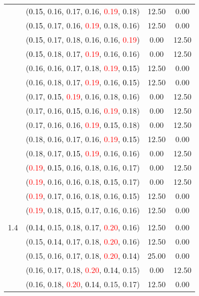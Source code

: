 \documentclass[10pt,a4paper]{report}
\begin{document}
\begin{center}
\begin{longtable}{clcc}
			&(\textcolor{black}{0.15}, 0.16, 0.17, 0.16, \textcolor{red}{0.19}, 0.18)&12.50&0.00\\
			&(\textcolor{black}{0.15}, 0.17, 0.16, \textcolor{red}{0.19}, 0.18, 0.16)&12.50&0.00\\
			&(\textcolor{black}{0.15}, 0.17, 0.18, 0.16, 0.16, \textcolor{red}{0.19})&0.00&12.50\\
			&(\textcolor{black}{0.15}, 0.18, 0.17, \textcolor{red}{0.19}, 0.16, 0.16)&0.00&12.50\\
			&(0.16, 0.16, 0.17, 0.18, \textcolor{red}{0.19}, \textcolor{black}{0.15})&12.50&0.00\\
			&(0.16, 0.18, 0.17, \textcolor{red}{0.19}, 0.16, \textcolor{black}{0.15})&12.50&0.00\\
			&(0.17, \textcolor{black}{0.15}, \textcolor{red}{0.19}, 0.16, 0.18, 0.16)&0.00&12.50\\
			&(0.17, 0.16, \textcolor{black}{0.15}, 0.16, \textcolor{red}{0.19}, 0.18)&0.00&12.50\\
			&(0.17, 0.16, 0.16, \textcolor{red}{0.19}, \textcolor{black}{0.15}, 0.18)&0.00&12.50\\
			&(0.18, 0.16, 0.17, 0.16, \textcolor{red}{0.19}, \textcolor{black}{0.15})&12.50&0.00\\
			&(0.18, 0.17, \textcolor{black}{0.15}, \textcolor{red}{0.19}, 0.16, 0.16)&0.00&12.50\\
			&(\textcolor{red}{0.19}, \textcolor{black}{0.15}, 0.16, 0.18, 0.16, 0.17)&0.00&12.50\\
			&(\textcolor{red}{0.19}, 0.16, 0.16, 0.18, \textcolor{black}{0.15}, 0.17)&0.00&12.50\\
			&(\textcolor{red}{0.19}, 0.17, 0.16, 0.18, 0.16, \textcolor{black}{0.15})&12.50&0.00\\
			&(\textcolor{red}{0.19}, 0.18, \textcolor{black}{0.15}, 0.17, 0.16, 0.16)&12.50&0.00\\
		&&&\\
		1.4			&(\textcolor{black}{0.14}, 0.15, 0.18, 0.17, \textcolor{red}{0.20}, 0.16)&12.50&0.00\\
			&(0.15, \textcolor{black}{0.14}, 0.17, 0.18, \textcolor{red}{0.20}, 0.16)&12.50&0.00\\
			&(0.15, 0.16, 0.17, 0.18, \textcolor{red}{0.20}, \textcolor{black}{0.14})&25.00&0.00\\
			&(0.16, 0.17, 0.18, \textcolor{red}{0.20}, \textcolor{black}{0.14}, 0.15)&0.00&12.50\\
			&(0.16, 0.18, \textcolor{red}{0.20}, \textcolor{black}{0.14}, 0.15, 0.17)&12.50&0.00\\

\end{longtable}
\end{center}
\end{document}
